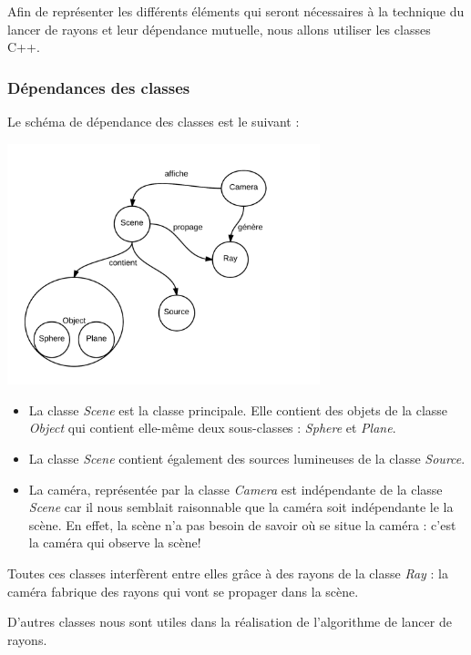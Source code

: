 \documentclass{article}
\begin{document}
Afin de représenter les différents éléments qui seront nécessaires à la technique du lancer de rayons et leur dépendance mutuelle, nous allons utiliser les classes C++.

\subsubsection{Dépendances des classes}
Le schéma de dépendance des classes est le suivant :
	\begin{center}
    		\includegraphics[height = 7cm]{schema.png}
  		\end{center}

	\begin{itemize}
\item La classe \emph{Scene} est la classe principale. Elle contient des objets de la classe \emph{Object} qui contient elle-même deux sous-classes : \emph{Sphere} et \emph{Plane}. 
\item La classe \emph{Scene} contient également des sources lumineuses de la classe \emph{Source}.
\item La caméra, représentée par la classe \emph{Camera} est indépendante de la classe \emph{Scene} car il nous semblait raisonnable que la caméra soit indépendante le la scène. En effet, la scène n'a pas besoin de savoir où se situe la caméra : c'est la caméra qui observe la scène! 

\end{itemize}
Toutes ces classes interfèrent entre elles grâce à des rayons de la classe \emph{Ray} : la caméra fabrique des rayons qui vont se propager dans la scène. 



D'autres classes nous sont utiles dans la réalisation de l'algorithme de lancer de rayons.
\end{document}

